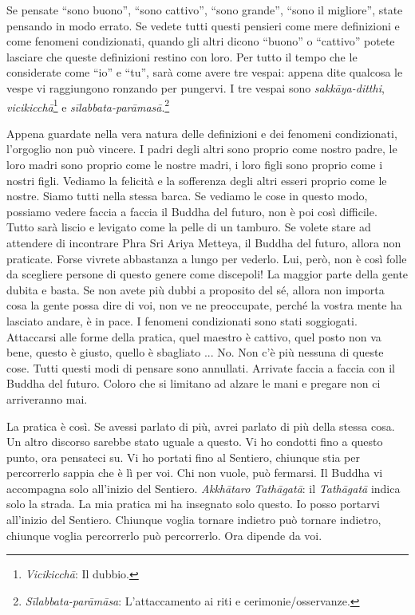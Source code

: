 Se pensate ``sono buono'', ``sono cattivo'', ``sono grande'', ``sono il
migliore'', state pensando in modo errato. Se vedete tutti questi
pensieri come mere definizioni e come fenomeni condizionati, quando gli
altri dicono ``buono'' o ``cattivo'' potete lasciare che queste
definizioni restino con loro. Per tutto il tempo che le considerate come
``io'' e ``tu'', sarà come avere tre vespai: appena dite qualcosa le
vespe vi raggiungono ronzando per pungervi. I tre vespai sono
\emph{sakkāya-ditthi}, \emph{vicikicchā}\footnote{\emph{Vicikicchā}: Il
  dubbio.} e \emph{sīlabbata-parāmasā}.\footnote{\emph{Sīlabbata-parāmāsa}:
  L'attaccamento ai riti e cerimonie/osservanze.}

Appena guardate nella vera natura delle definizioni e dei fenomeni
condizionati, l'orgoglio non può vincere. I padri degli altri sono
proprio come nostro padre, le loro madri sono proprio come le nostre
madri, i loro figli sono proprio come i nostri figli. Vediamo la
felicità e la sofferenza degli altri esseri proprio come le nostre.
Siamo tutti nella stessa barca. Se vediamo le cose in questo modo,
possiamo vedere faccia a faccia il Buddha del futuro, non è poi così
difficile. Tutto sarà liscio e levigato come la pelle di un tamburo. Se
volete stare ad attendere di incontrare Phra Sri Ariya Metteya, il
Buddha del futuro, allora non praticate. Forse vivrete abbastanza a
lungo per vederlo. Lui, però, non è così folle da scegliere persone di
questo genere come discepoli! La maggior parte della gente dubita e
basta. Se non avete più dubbi a proposito del sé, allora non importa
cosa la gente possa dire di voi, non ve ne preoccupate, perché la vostra
mente ha lasciato andare, è in pace. I fenomeni condizionati sono stati
soggiogati. Attaccarsi alle forme della pratica, quel maestro è cattivo,
quel posto non va bene, questo è giusto, quello è sbagliato ... No. Non
c'è più nessuna di queste cose. Tutti questi modi di pensare sono
annullati. Arrivate faccia a faccia con il Buddha del futuro. Coloro che
si limitano ad alzare le mani e pregare non ci arriveranno mai.

La pratica è così. Se avessi parlato di più, avrei parlato di più della
stessa cosa. Un altro discorso sarebbe stato uguale a questo. Vi ho
condotti fino a questo punto, ora pensateci su. Vi ho portati fino al
Sentiero, chiunque stia per percorrerlo sappia che è lì per voi. Chi non
vuole, può fermarsi. Il Buddha vi accompagna solo all'inizio del
Sentiero. \emph{Akkhātaro Tathāgatā}: il \emph{Tathāgatā} indica solo la
strada. La mia pratica mi ha insegnato solo questo. Io posso portarvi
all'inizio del Sentiero. Chiunque voglia tornare indietro può tornare
indietro, chiunque voglia percorrerlo può percorrerlo. Ora dipende da
voi.

